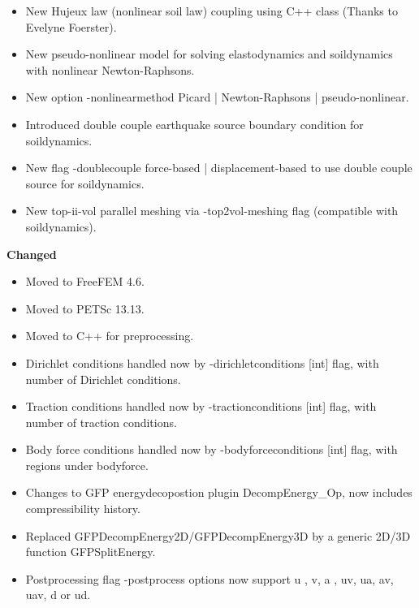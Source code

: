 \begin{itemize}
    \item New Hujeux law (nonlinear soil law) coupling using C++ class (Thanks to Evelyne Foerster).
    \item New pseudo-nonlinear model for solving elastodynamics and soildynamics with nonlinear Newton-Raphsons.
    \item New option {\ttfamily -nonlinearmethod Picard | Newton-Raphsons | pseudo-nonlinear}.
    \item Introduced double couple earthquake source boundary condition for soildynamics.
    \item New flag {\ttfamily -doublecouple force-based | displacement-based }  to use double couple source for soildynamics.
    \item New top-ii-vol parallel meshing via {\ttfamily -top2vol-meshing} flag (compatible with soildynamics).    
\end{itemize}


\textbf{Changed}
\begin{itemize}
\item Moved to FreeFEM 4.6.
\item Moved to PETSc 13.13.
\item Moved to C++ for preprocessing.
\item Dirichlet conditions handled now by {\ttfamily -dirichletconditions [int]} flag, with {\ttfamily  [int]} number of Dirichlet conditions.
\item Traction conditions handled now by {\ttfamily -tractionconditions [int]} flag, with {\ttfamily  [int]} number of traction conditions.
\item Body force conditions handled now by {\ttfamily -bodyforceconditions [int]} flag, with {\ttfamily  [int]} regions under bodyforce.
\item Changes to GFP energydecopostion plugin {\ttfamily DecompEnergy\_Op}, now includes compressibility history.
\item Replaced GFPDecompEnergy2D/GFPDecompEnergy3D by a generic 2D/3D function {\ttfamily GFPSplitEnergy}.
\item Postprocessing flag {\ttfamily -postprocess} options now support  {\ttfamily u} , {\ttfamily v},  {\ttfamily a} , {\ttfamily uv}, {\ttfamily ua}, {\ttfamily av}, {\ttfamily uav}, {\ttfamily d} or {\ttfamily ud}.

\end{itemize}


